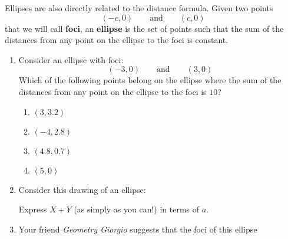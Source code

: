 \documentclass[nooutcomes,noauthor,handout]{ximera}
\begin{document}
\begin{question}
  Ellipses are also directly related to the distance formula.  Given
  two points
  \[
  (-c,0) \qquad\text{and} \qquad (c,0)
  \]
  that we will call \textbf{foci}, an \textbf{ellipse} is the set
  of points such that the sum of the distances from any point on
  the ellipse to the foci is constant.
  \begin{enumerate}      
  \item Consider an ellipse with foci:
    \[
    (-3,0) \qquad \text{and}\qquad (3,0)
    \]%
    Which of the following points belong on the ellipse where the sum
    of the distances from any point on the ellipse to the foci is
    $10$?
    \begin{enumerate}
    \item $(3,3.2)$ %
    \item $(-4,2.8)$ %
    \item $(4.8,0.7)$ %
    \item $(5,0)$ %
    \end{enumerate}
    \item Consider this drawing of an ellipse:
      \begin{center}
      \end{center}
      Express $X+Y$ (as simply as you can!) in terms of $a$.
    \item Your friend \textit{Geometry Giorgio} suggests that the foci of this ellipse
      \begin{center}
\end{center}
\end{enumerate}
\end{question}
\end{document}

